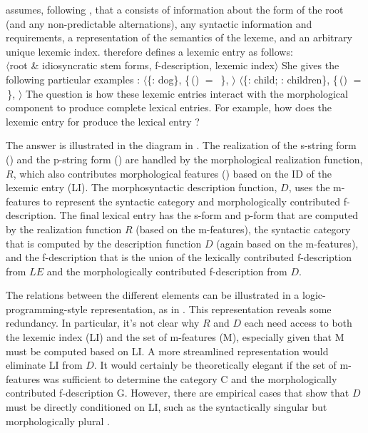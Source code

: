 \documentclass[output=paper,hidelinks]{langscibook}
\begin{document}
\citet[68]{dalrymple15} assumes, following \citet{spencer13}, that a
 consists of information about the form of the
root (and any non-predictable alternations), any syntactic information
and requirements, a representation of the semantics of the lexeme, and
an arbitrary unique lexemic index. \citet[68,~(7)]{dalrymple15} therefore defines
a lexemic entry as follows:
%
\ea
{}\\ $\langle$root \& idiosyncratic stem
  forms, f-description, lexemic index$\rangle$
\z
%
She gives the following particular examples \citep[68~(8--9)]{dalrymple15}:
\ea
\ea $\langle$\{: dog\}, \{\,(\UP\PRED) $=$ \,\}, $\rangle$
\ex $\langle$\{: child; : children\}, \{\,(\UP\PRED) $=$ \,\}, $\rangle$
\z\z
%
The question is how these lexemic entries interact with the
morphological component  to produce complete lexical
entries. For example, how does the lexemic entry for 
produce the lexical entry ?

The answer is illustrated in the diagram in
. The realization of the s-string form
() and the p-string form () are handled by
the morphological realization function, $R$, which also contributes
morphological features () based on the ID of the
lexemic entry (LI). The morphosyntactic description function, $D$,
uses the m-features to represent the syntactic category and
morphologically contributed f-description. The final lexical entry has
the s-form and p-form that are computed by the realization function
$R$ (based on the m-features), the syntactic category that is computed by
the description function $D$ (again based on the m-features), and the
f-description that is the union of the lexically contributed
f-description from $LE$ and the morphologically contributed
f-description from $D$.

The relations between the different elements can be illustrated in a
logic-pro\-gram\-ming-style representation, as in
. This representation reveals some
redundancy. In particular, it's not clear why $R$ and $D$ each need
access to both the lexemic index (LI) and the set of m-features (M),
especially given that M must be computed based on LI. A more
streamlined representation would eliminate LI from $D$. It would
certainly be theoretically elegant if the set of m-features was
sufficient to determine the category C and the morphologically
contributed f-description G. However, there are empirical cases that
show that $D$ must be directly conditioned on LI, such as the
syntactically singular but morphologically plural 
\citep[75]{dalrymple15}.
\end{document}
